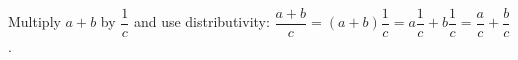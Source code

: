 Multiply $a+b$ by $\dfrac{1}{c}$ and use distributivity: $\dfrac{a+b}{c}=(a+b)\dfrac{1}{c}=a\dfrac{1}{c}+b\dfrac{1}{c}=\dfrac{a}{c}+\dfrac{b}{c}$.
